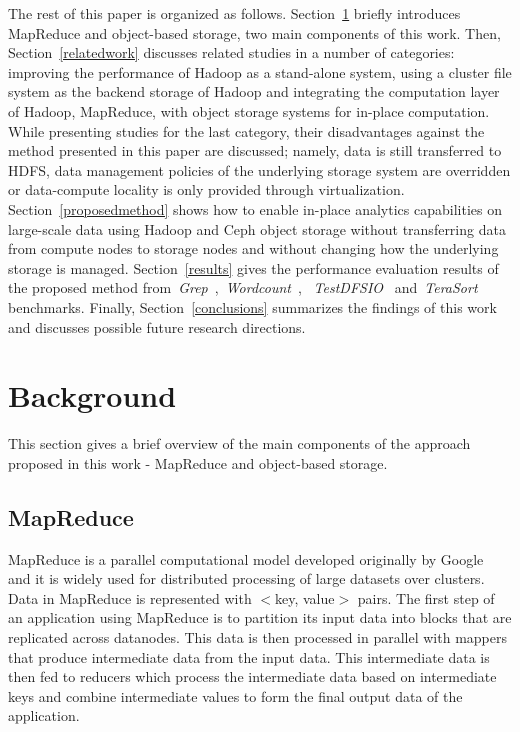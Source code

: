 \documentclass[preprint,12pt]{elsarticle}
\begin{document}
The rest of this paper is organized as follows.
Section~\ref{background} briefly introduces MapReduce and object-based storage,
two main components of this work.
Then, Section~\ref{relatedwork} discusses related studies in a number
of categories: improving the performance of Hadoop as a stand-alone system,
using a cluster file system as the backend storage of Hadoop and integrating
the computation layer of Hadoop, MapReduce, with object storage systems for
in-place computation. While presenting studies for the last category, their
disadvantages against the method presented in this paper are discussed; namely, data is
still transferred to HDFS, data management policies of the underlying storage
system are overridden or data-compute locality is only provided through virtualization.
Section~\ref{proposedmethod} shows how to enable in-place analytics capabilities on
large-scale data using Hadoop and Ceph object storage without transferring data
from compute nodes to storage nodes and without changing how the underlying storage
is managed.
Section~\ref{results} gives the performance evaluation results of the proposed
method from~\textit{Grep}~\cite{hadoopgrep},~\textit{Wordcount}~\cite{hadoopwordcount},
~\textit{TestDFSIO}~\cite{hadooptestdfsio} and~\textit{TeraSort}~\cite{hadoopterasort} benchmarks.
Finally, Section~\ref{conclusions} summarizes the findings of this work
and discusses possible future research directions.

\section{Background}
\label{background}
This section gives a brief overview of the main components of the
approach proposed in this work - MapReduce and object-based storage.

\subsection{MapReduce}
\label{mapreduce}
MapReduce is a parallel computational model developed originally by Google~\cite{Dean:2008:MSD:1327452.1327492}
and it is widely used for distributed processing of large datasets over clusters. Data in MapReduce is
represented with $<$key, value$>$ pairs. The first step of an
application using MapReduce is to partition its input data
into blocks that are replicated across datanodes. This data is then
processed in parallel with mappers that
produce intermediate data from the input data. This intermediate data
is then fed to reducers which process
the intermediate data based on intermediate keys and combine intermediate values to form the final output data of
the application.
\end{document}
